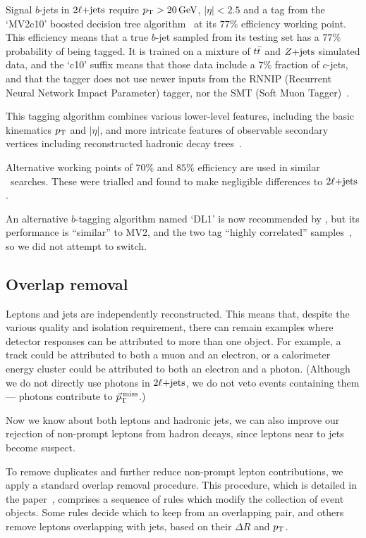 Signal $b$-jets in $\twoljets$ require $\pt > 20\,\eV[G]$, $|\eta| < 2.5$ and a
tag from the `MV2c10' boosted decision tree
algorithm~\cite{
friedman2002stochastic,
atlas_jet_mv2c10_2017,
atlas_jet_tagging_2019
} at its $77\%$ efficiency working point.
This efficiency means that a true $b$-jet sampled from its testing set has a
$77\%$ probability of being tagged.
It is trained on a mixture of $\ttbar$ and $\zjets$ simulated data,
and the `c10' suffix means that those data include a $7\%$ fraction of
$c$-jets, and that the tagger does not use newer inputs from the
RNNIP (Recurrent Neural Network Impact Parameter) tagger, nor the
SMT (Soft Muon Tagger)~\cite{atlas_twiki_mv2, atlas_jet_mv2c10_2017}.

This tagging algorithm combines various lower-level features, including the
basic kinematics $\pt$ and $|\eta|$, and more intricate features of
observable secondary vertices including reconstructed hadronic decay
trees~\cite{atlas_jet_mv2c10_2017}.

Alternative working points of $70\%$ and $85\%$ efficiency are used in similar
\atlas\ searches.
These were trialled and found to make negligible differences to $\twoljets$.

An alternative $b$-tagging algorithm named `DL1' is now recommended by \atlas,
but its performance is ``similar'' to MV2, and the two tag
``highly correlated'' samples~\cite{atlas_jet_tagging_2019}, so we did not
attempt to switch.


\subsection{Overlap removal}
\label{sec:2ljets_overlap_removal}
Leptons and jets are independently reconstructed.
This means that, despite the various quality and isolation requirement, there
can remain examples where detector responses can be attributed to more than
one object.
For example, a track could be attributed to both a muon and an electron,
or a calorimeter energy cluster could be attributed to both an electron and a
photon. (Although we do not directly use photons in $\twoljets$, we do not veto
events containing them --- photons contribute to $\ptmiss$.)

Now we know about both leptons and hadronic jets, we can also improve our
rejection of non-prompt leptons from hadron decays, since leptons near to jets
become suspect.

To remove duplicates and further reduce non-prompt lepton contributions, we
apply a standard overlap removal procedure.
This procedure, which is detailed in the paper~\cite{atlas2022searches},
comprises a sequence of rules which modify the collection of event objects.
Some rules decide which to keep from an overlapping pair,
and others remove leptons overlapping with jets, based on their $\Delta R$
and $\pt$.


